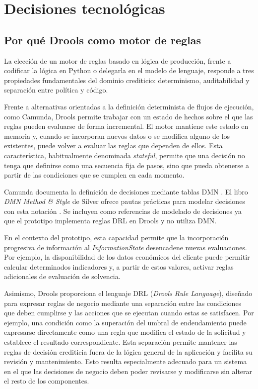\documentclass[12pt,a4paper]{report}
\begin{document}
\section{Decisiones tecnológicas}

\subsection{Por qué Drools como motor de reglas}

La elección de un motor de reglas basado en lógica de producción, frente a codificar la lógica en Python o delegarla en el modelo de lenguaje, responde a tres propiedades fundamentales del dominio crediticio: determinismo, auditabilidad y separación entre política y código.

Frente a alternativas orientadas a la definición determinista de flujos de ejecución, como Camunda, Drools permite trabajar con un estado de hechos sobre el que las reglas pueden evaluarse de forma incremental. El motor mantiene este estado en memoria y, cuando se incorporan nuevos datos o se modifica alguno de los existentes, puede volver a evaluar las reglas que dependen de ellos. Esta característica, habitualmente denominada \textit{stateful}, permite que una decisión no tenga que definirse como una secuencia fija de pasos, sino que pueda obtenerse a partir de las condiciones que se cumplen en cada momento.

Camunda documenta la definición de decisiones mediante tablas DMN \cite{camundaDmnDecisionTable}. El libro \textit{DMN Method \& Style} de Silver ofrece pautas prácticas para modelar decisiones con esta notación \cite{silver2024dmn}. Se incluyen como referencias de modelado de decisiones ya que el prototipo implementa reglas DRL en Drools y no utiliza DMN.

En el contexto del prototipo, esta capacidad permite que la incorporación progresiva de información al \textit{InformationState} desencadene nuevas evaluaciones. Por ejemplo, la disponibilidad de los datos económicos del cliente puede permitir calcular determinados indicadores y, a partir de estos valores, activar reglas adicionales de evaluación de solvencia.

Asimismo, Drools proporciona el lenguaje DRL (\textit{Drools Rule Language}), diseñado para expresar reglas de negocio mediante una separación entre las condiciones que deben cumplirse y las acciones que se ejecutan cuando estas se satisfacen. Por ejemplo, una condición como la superación del umbral de endeudamiento puede expresarse directamente como una regla que modifica el estado de la solicitud y establece el resultado correspondiente. Esta separación permite mantener las reglas de decisión crediticia fuera de la lógica general de la aplicación y facilita su revisión y mantenimiento. Esto resulta especialmente adecuado para un sistema en el que las decisiones de negocio deben poder revisarse y modificarse sin alterar el resto de los componentes.
\end{document}
